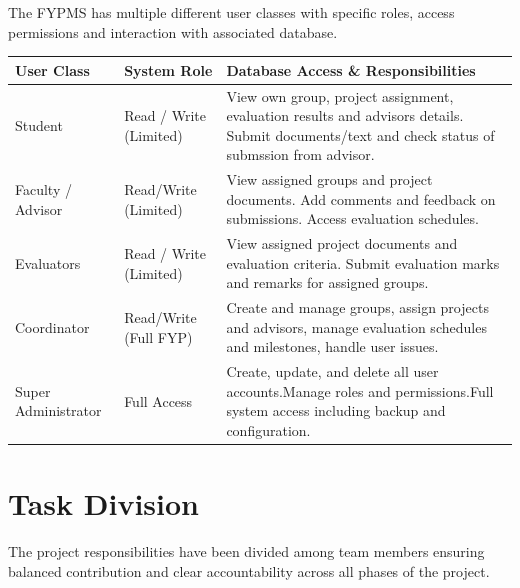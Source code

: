 \documentclass[12pt,a4paper]{report}
\begin{document}
The FYPMS has multiple different user classes with specific roles, access permissions and interaction with associated database.

\vspace{6pt}
\begin{longtable}{|L{2.4cm}|L{2.6cm}|p{8.2cm}|} 
    \hline
    \textbf{User Class} &
    \textbf{System Role} &
    \textbf{Database Access \& Responsibilities} \\
    \hline
    \endfirsthead

    
    Student &
    Read / Write (Limited) &
    View own group, project assignment, evaluation results and advisors details. Submit documents/text and check status of submssion from advisor. \\
    \hline
    
    Faculty / Advisor &
    Read/Write (Limited) &
    View assigned groups and project documents. Add comments and feedback on submissions. Access evaluation schedules. \\
    \hline
    
    
    Evaluators &
    Read / Write (Limited) &
    View assigned project documents and evaluation criteria. Submit evaluation marks and remarks for assigned groups. \\
    \hline
    
    Coordinator &
    Read/Write (Full FYP) &
    Create and manage groups, assign projects and advisors, manage evaluation schedules and milestones, handle user issues. \\
    \hline
    
    Super Administrator &
    Full Access &
    Create, update, and delete all user accounts.Manage roles and permissions.Full system access including backup and configuration. \\
    \hline
\end{longtable}

\section{Task Division}

The project responsibilities have been divided among team members ensuring balanced 
contribution and clear accountability across all phases of the project.

\vspace{6pt}
\end{document}

